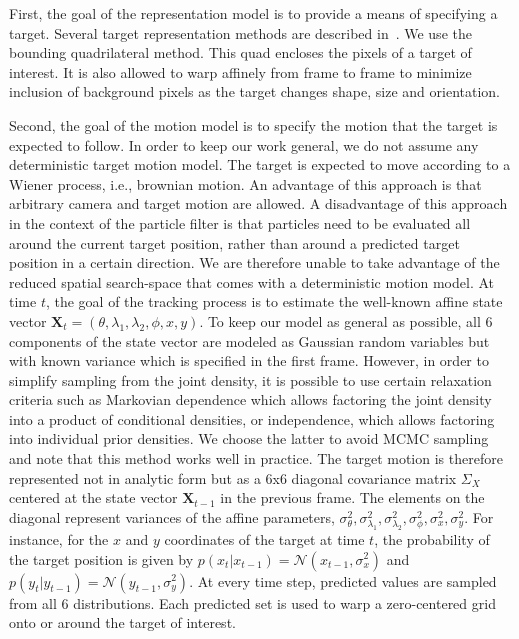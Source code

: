 \documentclass{article}
\begin{document}
First, the goal of the representation model is to provide a means of specifying a target.  Several target representation methods are described in~\cite{2006_JNL_SURVEYtrk_Yilmaz}.  We use the bounding quadrilateral method.  This quad encloses the pixels of a target of interest.  It is also allowed to warp affinely from frame to frame to minimize inclusion of background pixels as the target changes shape, size and orientation.

Second, the goal of the motion model is to specify the motion that the target is expected to follow.  In order to keep our work general, we do not assume any deterministic target motion model.  The target is expected to move according to a Wiener process, i.e., brownian motion.  An advantage of this approach is that arbitrary camera and target motion are allowed.  A disadvantage of this approach in the context of the particle filter is that particles need to be evaluated all around the current target position, rather than around a predicted target position in a certain direction.  We are therefore unable to take advantage of the reduced spatial search-space that comes with a deterministic motion model.  At time $t$, the goal of the tracking process is to estimate the well-known affine state vector $\mathbf{X}_t = (\theta, \lambda_1, \lambda_2, \phi, x, y)$.  To keep our model as general as possible, all 6 components of the state vector are modeled as Gaussian random variables but with known variance which is specified in the first frame.  However, in order to simplify sampling from the joint density, it is possible to use certain relaxation criteria such as Markovian dependence which allows factoring the joint density into a product of conditional densities, or independence, which allows factoring into individual prior densities.  We choose the latter to avoid MCMC sampling and note that this method works well in practice.  The target motion is therefore represented not in analytic form but as a 6x6 diagonal covariance matrix $\Sigma_X$ centered at the state vector $\mathbf{X}_{t-1}$ in the previous frame.  The elements on the diagonal represent variances of the affine parameters, $\sigma_\theta^2, \sigma_{\lambda_1}^2, \sigma_{\lambda_2}^2, \sigma_\phi^2, \sigma_x^2, \sigma_y^2$.  For instance, for the $x$ and $y$ coordinates of the target at time $t$, the probability of the target position is given by $p(x_t|x_{t-1}) = \mathcal{N}(x_{t-1}, \sigma_x^2)$ and $p(y_t|y_{t-1}) = \mathcal{N}(y_{t-1}, \sigma_y^2)$.  At every time step, predicted values are sampled from all 6 distributions.  Each predicted set is used to warp a zero-centered grid onto or around the target of interest.  
\end{document}
